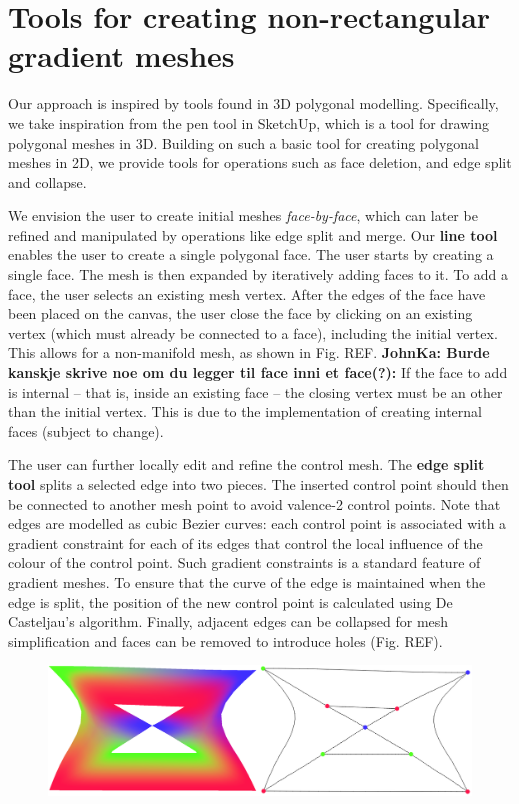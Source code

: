 \documentclass{egpubl}
\newcommand{\note}[3]{{\color{#2}\textbf{#1: #3}}}
\newcommand{\john}[1]{\note{JohnKa}{RubineRed}{#1}}
\begin{document}
\section{Tools for creating non-rectangular gradient meshes}
\label{sec:method}

Our approach is inspired by tools found in 3D polygonal modelling. Specifically, we take inspiration from the pen tool in SketchUp, which is a tool for drawing polygonal meshes in 3D. Building on such a basic tool for creating polygonal meshes in 2D, we provide tools for operations such as face deletion, and edge split and collapse.

We envision the user to create initial meshes \textit{face-by-face}, which can later be refined and manipulated by operations like edge split and merge. Our \textbf{line tool} enables the user to create a single polygonal face. The user starts by creating a single face. The mesh is then expanded by iteratively adding faces to it. To add a face, the user selects an existing mesh vertex. After the edges of the face have been placed on the canvas, the user close the face by clicking on an existing vertex (which must already be connected to a face), including the initial vertex. This allows for a non-manifold mesh, as shown in Fig. REF. \john{Burde kanskje skrive noe om du legger til face inni et face(?):} If the face to add is internal -- that is, inside an existing face -- the closing vertex must be an other than the initial vertex. This is due to the implementation of creating internal faces (subject to change).

The user can further locally edit and refine the control mesh. The \textbf{edge split tool} splits a selected edge into two pieces. The inserted control point should then be connected to another mesh point to avoid valence-2 control points. Note that edges are modelled as cubic Bezier curves: each control point is associated with a gradient constraint for each of its edges that control the local influence of the colour of the control point. Such gradient constraints is a standard feature of gradient meshes. To ensure that the curve of the edge is maintained when the edge is split, the position of the new control point is calculated using De Casteljau's algorithm. Finally, adjacent edges can be collapsed for mesh simplification and faces can be removed to introduce holes (Fig. REF).

\begin{figure}[t]
	\centering
	\includegraphics[height=0.25\textheight]{HoleAndNonManifoldMesh.png}
	\caption{ }
	\label{fig:adHocPentagon}
\end{figure}
\end{document}
